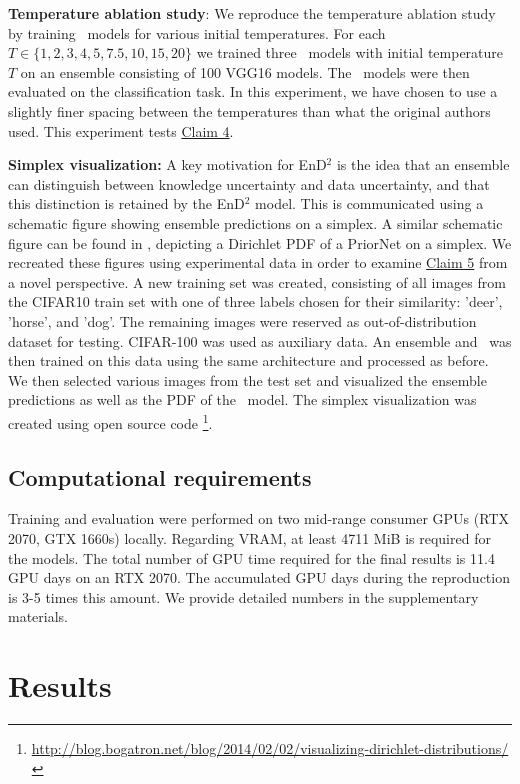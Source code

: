 \textbf{Temperature ablation study}: We reproduce the temperature ablation study by training \EnDD \ models for various initial temperatures. For each $T \in \{1, 2, 3, 4, 5, 7.5, 10, 15, 20\}$ we trained three \EnDD \ models with initial temperature $T$ on an ensemble consisting of 100 VGG16 models. The \EnDD \ models were then evaluated on the classification task. In this experiment, we have chosen to use a slightly finer spacing between the temperatures than what the original authors used. This experiment tests \hyperlink{claim4}{Claim 4}.

\textbf{Simplex visualization:} A key motivation for EnD$^2$ is the idea that an ensemble can distinguish between knowledge uncertainty and data uncertainty, and that this distinction is retained by the EnD$^2$ model. This is communicated using a schematic figure showing ensemble predictions on a simplex. A similar schematic figure can be found in \cite{NIPS2018_7936}, depicting a Dirichlet PDF of a PriorNet on a simplex. We recreated these figures using experimental data in order to examine \hyperlink{claim5}{Claim 5} from a novel perspective. A new training set was created, consisting of all images from the CIFAR10 train set with one of three labels chosen for their similarity: 'deer', 'horse', and 'dog'. The remaining images were reserved as out-of-distribution dataset for testing. CIFAR-100 was used as auxiliary data. An ensemble and \EnDD \ was then trained on this data using the same architecture and processed as before. We then selected various images from the test set and visualized the ensemble predictions as well as the PDF of the \EnDD \ model. The simplex visualization was created using open source code \footnote{\url{http://blog.bogatron.net/blog/2014/02/02/visualizing-dirichlet-distributions/}}.

\subsection{Computational requirements}
Training and evaluation were performed on two mid-range consumer GPUs (RTX 2070, GTX 1660s) locally. Regarding VRAM, at least 4711 MiB is required for the models. The total number of GPU time required for the final results is 11.4 GPU days on an RTX 2070. The accumulated GPU days during the reproduction is 3-5 times this amount. We provide detailed numbers in the supplementary materials. 
\section{Results}

